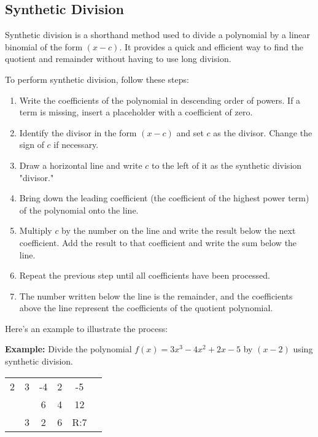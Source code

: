 \documentclass[11pt]{article}
\begin{document}
\subsection{Synthetic Division}

Synthetic division is a shorthand method used to divide a polynomial by a linear binomial of the form $(x - c)$. It provides a quick and efficient way to find the quotient and remainder without having to use long division.

To perform synthetic division, follow these steps:

\begin{enumerate}
  \item Write the coefficients of the polynomial in descending order of powers. If a term is missing, insert a placeholder with a coefficient of zero.
  \item Identify the divisor in the form $(x - c)$ and set $c$ as the divisor. Change the sign of $c$ if necessary.
  \item Draw a horizontal line and write $c$ to the left of it as the synthetic division "divisor."
  \item Bring down the leading coefficient (the coefficient of the highest power term) of the polynomial onto the line.
  \item Multiply $c$ by the number on the line and write the result below the next coefficient. Add the result to that coefficient and write the sum below the line.
  \item Repeat the previous step until all coefficients have been processed.
  \item The number written below the line is the remainder, and the coefficients above the line represent the coefficients of the quotient polynomial.
\end{enumerate}

Here's an example to illustrate the process:

\textbf{Example:} Divide the polynomial $f(x) = 3x^3 - 4x^2 + 2x - 5$ by $(x - 2)$ using synthetic division.

\begin{center}
\begin{tabular}{c|ccccc}
  2 & 3 & -4 & 2 & -5 &\\
    &   & 6 & 4 & 12 & \\
  \hline
  & 3 & 2 & 6 & R:7 \\
\end{tabular}
\end{center}
\end{document}
